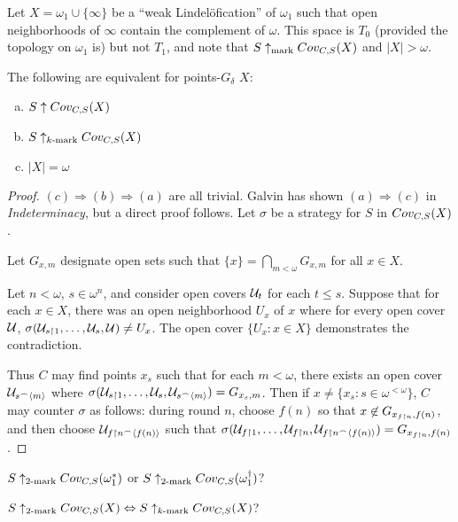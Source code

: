 
  \begin{example}
    Let $X=\omega_1\cup\{\infty\}$ be a ``weak Lindel\"ofication'' of $\omega_1$ such that open neighborhoods of $\infty$ contain the complement of $\omega$. This space is $T_0$ (provided the topology on $\omega_1$ is) but not $T_1$, and note that $S\uparrow_{\text{mark}}Cov_{C,S}(X)$ and $|X|>\omega$.
  \end{example}

  \begin{theorem}
    The following are equivalent for points-$G_\delta$ $X$:
      \begin{enumerate}[(a)]
        \item $S\uparrow Cov_{C,S}(X)$
        \item $S\uparrow_{k\text{-mark}}Cov_{C,S}(X)$
        \item $|X|=\omega$
      \end{enumerate}
  \end{theorem}

  \begin{proof}
    $(c)\Rightarrow(b)\Rightarrow(a)$ are all trivial. Galvin has shown $(a)\Rightarrow(c)$ in \textit{Indeterminacy}, but a direct proof follows. Let $\sigma$ be a strategy for $S$ in $Cov_{C,S}(X)$.

    Let $G_{x,m}$ designate open sets such that $\{x\}=\bigcap_{m<\omega}G_{x,m}$ for all $x\in X$.

    Let $n<\omega$, $s\in\omega^{n}$, and consider open covers $\mathcal{U}_t$ for each $t\leq s$. Suppose that for each $x\in X$, there was an open neighborhood $U_x$ of $x$ where for every open cover $\mathcal{U}$, $\sigma(\mathcal{U}_{s\restriction 1},\dots,\mathcal{U}_{s},\mathcal{U})\not=U_x$. The open cover $\{U_x : x\in X\}$ demonstrates the contradiction.

    Thus $C$ may find points $x_s$ such that for each $m<\omega$, there exists an open cover $\mathcal{U}_{s^\frown\langle m\rangle}$ where $\sigma(\mathcal{U}_{s\restriction 1},\dots,\mathcal{U}_{s},\mathcal{U}_{s^\frown\langle m\rangle})=G_{x_s,m}$. Then if $x\not=\{x_s : s\in\omega^{<\omega}\}$, $C$ may counter $\sigma$ as follows: during round $n$, choose $f(n)$ so that $x\not\in G_{x_{f\restriction n},f(n)}$, and then choose $\mathcal{U}_{f\restriction n^\frown\langle f(n)\rangle}$ such that $\sigma(\mathcal{U}_{f\restriction 1},\dots,\mathcal{U}_{f\restriction n},\mathcal{U}_{f\restriction n^\frown\langle f(n)\rangle})=G_{x_{f\restriction n},f(n)}$.
  \end{proof} 

  \begin{question}
    $S\uparrow_{2\text{-mark}}Cov_{C,S}(\omega_1^*)$ or $S\uparrow_{2\text{-mark}}Cov_{C,S}(\omega_1^\dagger)$?
  \end{question}

  \begin{question}
    $S\uparrow_{2\text{-mark}}Cov_{C,S}(X)\Leftrightarrow S\uparrow_{k\text{-mark}}Cov_{C,S}(X)$?
  \end{question}

